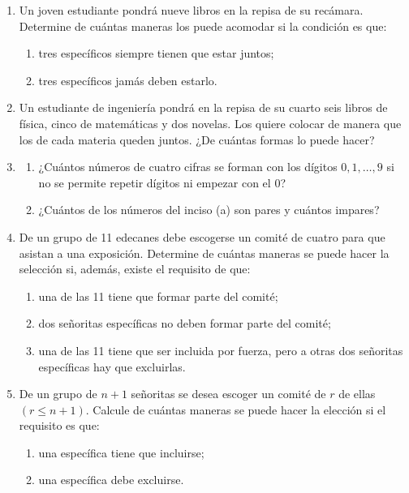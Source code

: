 \begin{Ejer}
\begin{enumerate}
\item Un joven estudiante pondr\'a nueve libros en la repisa de su rec\'amara. Determine de cu\'antas maneras los puede acomodar si la condici\'on es que:
\begin{enumerate}
\item tres espec\'ificos siempre tienen que estar juntos;
\item tres espec\'ificos jam\'as deben estarlo.
\end{enumerate}

\item Un estudiante de ingenier\'ia pondr\'a en la repisa de su cuarto seis libros de f\'isica, cinco de matem\'aticas y dos novelas. Los quiere colocar de manera que los de cada materia queden juntos. ¿De cu\'antas formas lo puede hacer?

\item 
\begin{enumerate}
\item ¿Cu\'antos n\'umeros de cuatro cifras se forman con los d\'igitos $0,1,\ldots,9$ si no se permite repetir d\'igitos ni empezar con el $0$?
\item ¿Cu\'antos de los n\'umeros del inciso (a) son pares y cu\'antos impares?
\end{enumerate}

\item De un grupo de 11 edecanes debe escogerse un comit\'e de cuatro para que asistan a una exposici\'on. Determine de cu\'antas maneras se puede hacer la selecci\'on si, adem\'as, existe el requisito de que:
\begin{enumerate}
\item una de las 11 tiene que formar parte del comit\'e;
\item dos se\~noritas espec\'ificas no deben formar parte del comit\'e;
\item una de las 11 tiene que ser incluida por fuerza, pero a otras dos se\~noritas espec\'ificas hay que excluirlas.
\end{enumerate}

\item De un grupo de $n+1$ se\~noritas se desea escoger un comit\'e de $r$ de ellas $(r\leq n+1)$. Calcule de cu\'antas maneras se puede hacer la elecci\'on si el requisito es que:
\begin{enumerate}
\item una espec\'ifica tiene que incluirse;
\item una espec\'ifica debe excluirse.
\end{enumerate}


\end{enumerate}
\end{Ejer}
